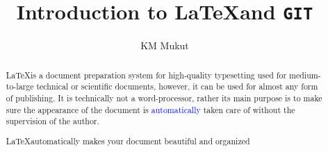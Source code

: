 \documentclass[a4paper, 12pt, one column]{article}
\title{Introduction to \LaTeX \space and \texttt{GIT}}
\author{KM Mukut}
\begin{document}
\maketitle

\begin{abstract}

    {\color{red}\LaTeX is a document preparation system for high-quality typesetting used for medium-to-large technical or scientific documents, however,  it can be used for almost any form of publishing. It is technically not a word-processor, rather its main purpose is to make sure the appearance of the document is \textcolor{blue}{automatically} taken care of without the supervision of the author. }
    
    \vspace{0.3cm}

     {
            {
            \begin{minipage}{0.8\textwidth}
                \centering
               \LaTeX \space automatically makes your document beautiful and organized 
            \end{minipage}
            }
        }

\end{abstract}
\end{document}
